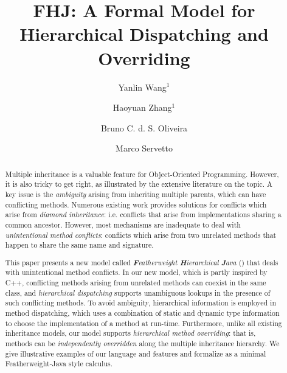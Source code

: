 \documentclass[a4paper,english]{lipics-v2018}
\title{FHJ: A Formal Model for Hierarchical Dispatching and Overriding}
\author{Yanlin Wang$^1$}
{The University of Hong Kong, China}
{ylwang@cs.hku.hk}
{}{}%
\author{Haoyuan Zhang$^1$}
{The University of Hong Kong, China}
{hyzhang@cs.hku.hk}
{}{}
\author{Bruno C. d. S. Oliveira}
{The University of Hong Kong, China}
{bruno@cs.hku.hk}
{}{Funded by Hong Kong Research Grant Council projects number 17210617 and 17258816}
\author{Marco Servetto}
{Victoria University of Wellington, New Zealand}
{marco.servetto@ecs.vuw.ac.nz}
{}{}
\begin{document}
\maketitle

\begin{abstract}
Multiple inheritance is a valuable feature for Object-Oriented
Programming. However, it is also tricky to get right, as illustrated by
the extensive literature on the topic. A key issue 
is the \emph{ambiguity} arising from inheriting multiple parents,
which can have conflicting methods. 
Numerous existing work provides solutions for 
conflicts which arise from \emph{diamond inheritance}: i.e.
conflicts that arise from implementations sharing a common 
ancestor. However, most mechanisms are inadequate to deal 
with \emph{unintentional method conflicts}: conflicts which 
arise from two unrelated methods that happen to share the same name
and signature. 

This paper presents a new model called \emph{\textbf{F}eatherweight
  \textbf{H}ierarchical \textbf{J}ava} (\name{}) that deals with
unintentional method conflicts.  In our new model, which is partly
inspired by C++, conflicting methods arising from unrelated methods
can coexist in the same class, and \emph{hierarchical dispatching}
supports unambiguous lookups in the presence of such conflicting
methods.  To avoid ambiguity, hierarchical information is employed in
method dispatching, which uses a combination of static and dynamic
type information to choose the implementation of a method at run-time.
Furthermore, unlike all existing inheritance models, our model
supports \emph{hierarchical method overriding}: that is, methods can
be \emph{independently overridden} along the multiple inheritance
hierarchy. We give illustrative examples of our language and features
and formalize \name{} as a minimal Featherweight-Java style calculus.
\end{abstract}











\newpage
\appendix

\end{document}
